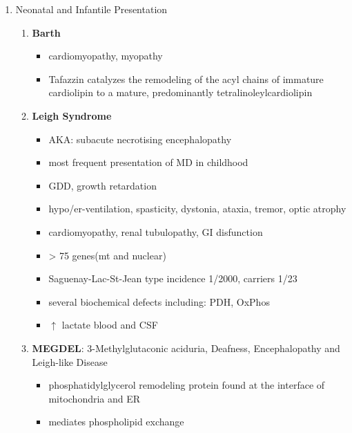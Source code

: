 \documentclass{scrartcl}
\begin{document}
\begin{enumerate}
\item Neonatal and Infantile Presentation
\label{sec:orgdd6adda}
\begin{enumerate}
\item \textbf{Barth}
\label{sec:org5c77eff}
\begin{itemize}
\item cardiomyopathy, myopathy
\item Tafazzin catalyzes the remodeling of the acyl chains of immature
cardiolipin to a mature, predominantly tetralinoleylcardiolipin
\end{itemize}
\item \textbf{Leigh Syndrome}
\label{sec:org74e6c89}
\begin{itemize}
\item AKA: subacute necrotising encephalopathy
\item most frequent presentation of MD in childhood
\item GDD, growth retardation
\item hypo/er-ventilation, spasticity, dystonia, ataxia, tremor, optic atrophy
\item cardiomyopathy, renal tubulopathy, GI disfunction
\item \textgreater{} 75 genes(mt and nuclear)
\item Saguenay-Lac-St-Jean type incidence 1/2000, carriers 1/23
\item several biochemical defects including: PDH, OxPhos
\item \(\uparrow\) lactate blood and CSF
\end{itemize}
\item \textbf{MEGDEL}: 3-Methylglutaconic aciduria, Deafness, Encephalopathy and Leigh-like Disease
\label{sec:orgd440a06}
\begin{itemize}
\item phosphatidylglycerol remodeling protein found at the interface of
mitochondria and ER
\item mediates phospholipid exchange
\end{itemize}


\end{enumerate}
\end{enumerate}
\end{document}
